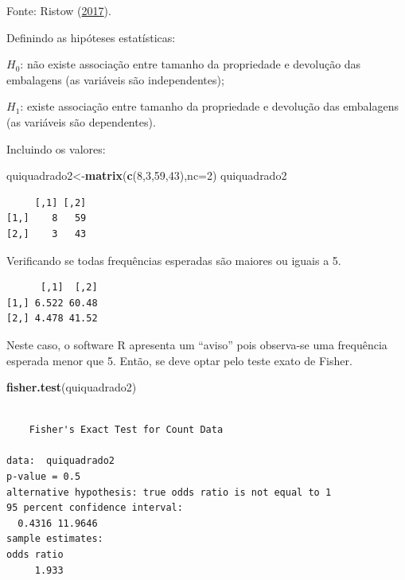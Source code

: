 \documentclass[12pt,brazil,oneside]{book}
\newenvironment{Shaded}{\begin{snugshade}}{\end{snugshade}}
\newcommand{\DataTypeTok}[1]{\textcolor[rgb]{0.13,0.29,0.53}{#1}}
\newcommand{\DecValTok}[1]{\textcolor[rgb]{0.00,0.00,0.81}{#1}}
\newcommand{\KeywordTok}[1]{\textcolor[rgb]{0.13,0.29,0.53}{\textbf{#1}}}
\newcommand{\NormalTok}[1]{#1}
\newcommand{\OperatorTok}[1]{\textcolor[rgb]{0.81,0.36,0.00}{\textbf{#1}}}
\begin{document}
Fonte: Ristow (\protect\hyperlink{ref-Ristow2017}{2017}).

Definindo as hipóteses estatísticas:

\(H_0\): não existe associação entre tamanho da propriedade e devolução das embalagens (as variáveis são independentes);

\(H_1\): existe associação entre tamanho da propriedade e devolução das embalagens (as variáveis são dependentes).

Incluindo os valores:

\begin{Shaded}
\begin{Highlighting}[]
\NormalTok{quiquadrado2<-}\KeywordTok{matrix}\NormalTok{(}\KeywordTok{c}\NormalTok{(}\DecValTok{8}\NormalTok{,}\DecValTok{3}\NormalTok{,}\DecValTok{59}\NormalTok{,}\DecValTok{43}\NormalTok{),}\DataTypeTok{nc=}\DecValTok{2}\NormalTok{)}
\NormalTok{quiquadrado2}
\end{Highlighting}
\end{Shaded}

\begin{verbatim}
     [,1] [,2]
[1,]    8   59
[2,]    3   43
\end{verbatim}

Verificando se todas frequências esperadas são maiores ou iguais a 5.

\begin{Shaded}
\end{Shaded}

\begin{verbatim}
      [,1]  [,2]
[1,] 6.522 60.48
[2,] 4.478 41.52
\end{verbatim}

Neste caso, o software R apresenta um ``aviso'' pois observa-se uma frequência esperada menor que 5. Então, se deve optar pelo teste exato de Fisher.

\begin{Shaded}
\begin{Highlighting}[]
\KeywordTok{fisher.test}\NormalTok{(quiquadrado2)}
\end{Highlighting}
\end{Shaded}

\begin{verbatim}

    Fisher's Exact Test for Count Data

data:  quiquadrado2
p-value = 0.5
alternative hypothesis: true odds ratio is not equal to 1
95 percent confidence interval:
  0.4316 11.9646
sample estimates:
odds ratio 
     1.933 
\end{verbatim}
\end{document}
